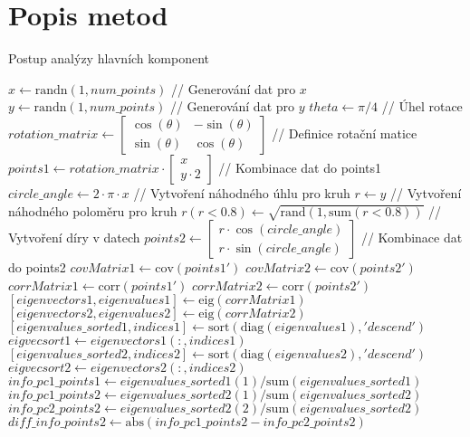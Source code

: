 \section{Popis metod}

\begin{algorithm}
    \caption{Postup analýzy hlavních komponent}
    \begin{algorithmic}[1]
        \STATE $x \gets \text{randn}(1, num\_points)$ // Generování dat pro $x$
        \STATE $y \gets \text{randn}(1, num\_points)$ // Generování dat pro $y$
        \STATE $theta \gets \pi / 4$ // Úhel rotace
        \STATE $rotation\_matrix \gets \begin{bmatrix} \cos(\theta) & -\sin(\theta) \\ \sin(\theta) & \cos(\theta) \end{bmatrix}$ // Definice rotační matice
        \STATE $points1 \gets rotation\_matrix \cdot \begin{bmatrix} x \\ y \cdot 2 \end{bmatrix}$ // Kombinace dat do points1
        \STATE $circle\_angle \gets 2 \cdot \pi \cdot x$ // Vytvoření náhodného úhlu pro kruh
        \STATE $r \gets y$ // Vytvoření náhodného poloměru pro kruh
            \STATE $r(r < 0.8) \gets \sqrt{\text{rand}(1, \text{sum}(r < 0.8))}$ // Vytvoření díry v datech
        \ENDWHILE
        \STATE $points2 \gets \begin{bmatrix} r \cdot \cos(circle\_angle) \\ r \cdot \sin(circle\_angle) \end{bmatrix}$ // Kombinace dat do points2
        \STATE $covMatrix1 \gets \text{cov}(points1')$
        \STATE $covMatrix2 \gets \text{cov}(points2')$
        \STATE $corrMatrix1 \gets \text{corr}(points1')$
        \STATE $corrMatrix2 \gets \text{corr}(points2')$
        \STATE $[eigenvectors1, eigenvalues1] \gets \text{eig}(corrMatrix1)$
        \STATE $[eigenvectors2, eigenvalues2] \gets \text{eig}(corrMatrix2)$
        \STATE $[eigenvalues\_sorted1, indices1] \gets \text{sort}(\text{diag}(eigenvalues1), 'descend')$
        \STATE $eigvecsort1 \gets eigenvectors1(:, indices1)$
        \STATE $[eigenvalues\_sorted2, indices2] \gets \text{sort}(\text{diag}(eigenvalues2), 'descend')$
        \STATE $eigvecsort2 \gets eigenvectors2(:, indices2)$
        \STATE $info\_pc1\_points1 \gets eigenvalues\_sorted1(1) / \text{sum}(eigenvalues\_sorted1)$
        \STATE $info\_pc1\_points2 \gets eigenvalues\_sorted2(1) / \text{sum}(eigenvalues\_sorted2)$
        \STATE $info\_pc2\_points2 \gets eigenvalues\_sorted2(2) / \text{sum}(eigenvalues\_sorted2)$
        \STATE $diff\_info\_points2 \gets \text{abs}(info\_pc1\_points2 - info\_pc2\_points2)$
    \end{algorithmic}
\end{algorithm}